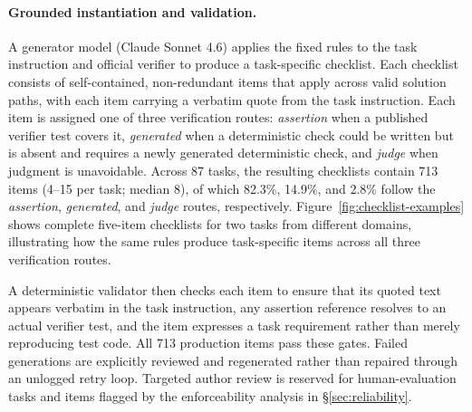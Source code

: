\documentclass[sigconf,nonacm]{acmart}
\begin{document}
\paragraph{Grounded instantiation and validation.}
A generator model (Claude Sonnet 4.6) applies the fixed rules to the task instruction and official verifier to produce a task-specific checklist. Each checklist consists of self-contained, non-redundant items that apply across valid solution paths, with each item carrying a verbatim quote from the task instruction. Each item is assigned one of three verification routes: \emph{assertion} when a published
verifier test covers it, \emph{generated} when a deterministic check could be
written but is absent and requires a newly generated deterministic check, and \emph{judge} when judgment is unavoidable. Across 87 tasks, the resulting checklists contain 713 items (4--15 per task; median 8), of which
82.3\%, 14.9\%, and 2.8\% follow the \emph{assertion}, \emph{generated}, and \emph{judge} routes, respectively.
Figure~\ref{fig:checklist-examples} shows complete five-item checklists for
two tasks from different domains, illustrating how the same rules produce
task-specific items across all three verification routes.

A deterministic validator then checks each item to ensure that its quoted text appears verbatim in the task instruction, any assertion reference resolves to an actual verifier test, and the item expresses a task requirement rather than merely reproducing test code. All 713 production items pass these gates. Failed generations are explicitly reviewed and regenerated rather than repaired through an unlogged retry loop. Targeted author review is reserved for human-evaluation tasks and items flagged by the enforceability analysis in \S\ref{sec:reliability}.
\end{document}

